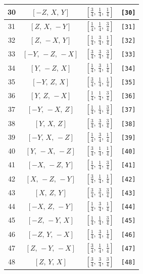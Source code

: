 \documentclass[fleqn,8pt]{jsarticle}
\begin{document}
\begin{longtable}{cccc}
30 & $\left[ - Z,\, X,\, Y \right]$ & $\left[ \frac{3}{4},\, \frac{1}{4},\, \frac{1}{4} \right]$ & {\tt [30]} \\ \hline
31 & $\left[ Z,\, X,\, - Y \right]$ & $\left[ \frac{1}{4},\, \frac{1}{4},\, \frac{3}{4} \right]$ & {\tt [31]} \\ \hline
32 & $\left[ Z,\, - X,\, Y \right]$ & $\left[ \frac{1}{4},\, \frac{3}{4},\, \frac{1}{4} \right]$ & {\tt [32]} \\ \hline
33 & $\left[ - Y,\, - Z,\, - X \right]$ & $\left[ \frac{3}{4},\, \frac{3}{4},\, \frac{3}{4} \right]$ & {\tt [33]} \\ \hline
34 & $\left[ Y,\, - Z,\, X \right]$ & $\left[ \frac{1}{4},\, \frac{3}{4},\, \frac{1}{4} \right]$ & {\tt [34]} \\ \hline
35 & $\left[ - Y,\, Z,\, X \right]$ & $\left[ \frac{3}{4},\, \frac{1}{4},\, \frac{1}{4} \right]$ & {\tt [35]} \\ \hline
36 & $\left[ Y,\, Z,\, - X \right]$ & $\left[ \frac{1}{4},\, \frac{1}{4},\, \frac{3}{4} \right]$ & {\tt [36]} \\ \hline
37 & $\left[ - Y,\, - X,\, Z \right]$ & $\left[ \frac{1}{4},\, \frac{1}{4},\, \frac{3}{4} \right]$ & {\tt [37]} \\ \hline
38 & $\left[ Y,\, X,\, Z \right]$ & $\left[ \frac{3}{4},\, \frac{3}{4},\, \frac{3}{4} \right]$ & {\tt [38]} \\ \hline
39 & $\left[ - Y,\, X,\, - Z \right]$ & $\left[ \frac{1}{4},\, \frac{3}{4},\, \frac{1}{4} \right]$ & {\tt [39]} \\ \hline
40 & $\left[ Y,\, - X,\, - Z \right]$ & $\left[ \frac{3}{4},\, \frac{1}{4},\, \frac{1}{4} \right]$ & {\tt [40]} \\ \hline
41 & $\left[ - X,\, - Z,\, Y \right]$ & $\left[ \frac{1}{4},\, \frac{1}{4},\, \frac{3}{4} \right]$ & {\tt [41]} \\ \hline
42 & $\left[ X,\, - Z,\, - Y \right]$ & $\left[ \frac{3}{4},\, \frac{1}{4},\, \frac{1}{4} \right]$ & {\tt [42]} \\ \hline
43 & $\left[ X,\, Z,\, Y \right]$ & $\left[ \frac{3}{4},\, \frac{3}{4},\, \frac{3}{4} \right]$ & {\tt [43]} \\ \hline
44 & $\left[ - X,\, Z,\, - Y \right]$ & $\left[ \frac{1}{4},\, \frac{3}{4},\, \frac{1}{4} \right]$ & {\tt [44]} \\ \hline
45 & $\left[ - Z,\, - Y,\, X \right]$ & $\left[ \frac{1}{4},\, \frac{1}{4},\, \frac{3}{4} \right]$ & {\tt [45]} \\ \hline
46 & $\left[ - Z,\, Y,\, - X \right]$ & $\left[ \frac{1}{4},\, \frac{3}{4},\, \frac{1}{4} \right]$ & {\tt [46]} \\ \hline
47 & $\left[ Z,\, - Y,\, - X \right]$ & $\left[ \frac{3}{4},\, \frac{1}{4},\, \frac{1}{4} \right]$ & {\tt [47]} \\ \hline
48 & $\left[ Z,\, Y,\, X \right]$ & $\left[ \frac{3}{4},\, \frac{3}{4},\, \frac{3}{4} \right]$ & {\tt [48]} \\
\end{longtable}
\end{document}

